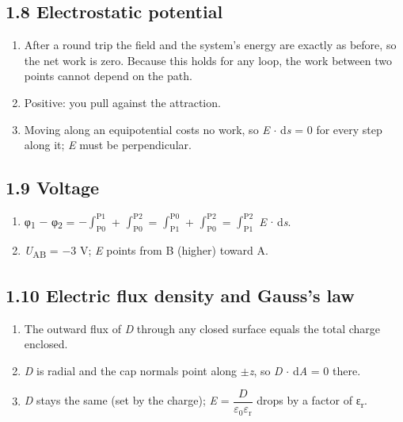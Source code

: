 \documentclass[11pt]{article}
\begin{document}
\begin{keepsection}\subsection{1.8 Electrostatic potential}

\begin{enumerate}
\item After a round trip the field and the system’s energy are exactly as before, so the net work is zero. Because this holds for any loop, the work between two points cannot depend on the path.
\item Positive: you pull against the attraction.
\item Moving along an equipotential costs no work, so \textit{E} \ensuremath{\cdot} d\textit{s} = 0 for every step along it; \textit{E} must be perpendicular.
\end{enumerate}

\end{keepsection}
\begin{keepsection}\subsection{1.9 Voltage}

\begin{enumerate}
\item φ\textsubscript{1} \ensuremath{-} φ\textsubscript{2} = \ensuremath{-}$\int_{\mathrm{P}0}^{\mathrm{P}1} $ + $\int_{\mathrm{P}0}^{\mathrm{P}2} $ = $\int_{\mathrm{P}1}^{\mathrm{P}0} $ + $\int_{\mathrm{P}0}^{\mathrm{P}2} $ = $\int_{\mathrm{P}1}^{\mathrm{P}2} $ \textit{E} \ensuremath{\cdot} d\textit{s}.
\item \textit{U}\textsubscript{AB} = \ensuremath{-}3 V; \textit{E} points from B (higher) toward A.
\end{enumerate}

\end{keepsection}
\begin{keepsection}\subsection{1.10 Electric flux density and Gauss’s law}

\begin{enumerate}
\item The outward flux of \textit{D} through any closed surface equals the total charge enclosed.
\item \textit{D} is radial and the cap normals point along \ensuremath{\pm}\textit{z}, so \textit{D} \ensuremath{\cdot} d\textit{A} = 0 there.
\item \textit{D} stays the same (set by the charge); \textit{E} = {\small\ensuremath{\dfrac{{D}}{ε_{0}ε_{\mathrm{r}}}}} drops by a factor of ε\textsubscript{r}.
\end{enumerate}

\end{keepsection}
\end{document}

